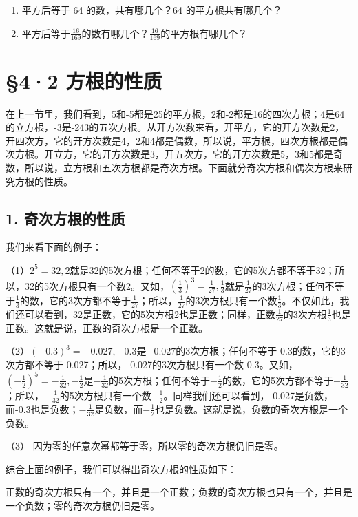 \begin{enumerate}[start=9]
\item
  平方后等于 64 的数，共有哪几个？64 的平方根共有哪几个？
\item
  平方后等于\(\frac{16}{169}\)的数有哪几个？\(\frac{16}{169}\)的平方根有哪几个？
\end{enumerate}

\section{§4·2 方根的性质}

在上一节里，我们看到，5和-5都是25的平方根，2和-2都是16的四次方根；4是64的立方根，-3是-243的五次方根。从开方次数来看，开平方，它的开方次数是2，开四次方，它的开方次数是4，2和4都是偶数，所以说，平方根，四次方根都是偶次方根。开立方，它的开方次数是3，开五次方，它的开方次数是5，3和5都是奇数，所以说，立方根和五次方根都是奇次方根。下面就分奇次方根和偶次方根来研究方根的性质。

\subsection{1. 奇次方根的性质}

我们来看下面的例子：

（1）\(2^{5} = 32, 2\)就是32的5次方根；任何不等于2的数，它的5次方都不等于32；所以，32的5次方根只有一个数2。又如，\(\left(\frac{1}{3}\right)^{3} = \frac{1}{27}, \frac{1}{3}\)就是\(\frac{1}{27}\)的3次方根；任何不等于\(\frac{1}{3}\)的数，它的3次方都不等于\(\frac{1}{27}\)；所以，\(\frac{1}{27}\)的3次方根只有一个数\(\frac{1}{3}\)。不仅如此，我们还可以看到，32是正数，它的5次方根2也是正数；同样，正数\(\frac{1}{27}\)的3次方根\(\frac{1}{3}\)也是正数。这就是说，正数的奇次方根是一个正数。

（2）\((-0.3)^{3} = -0.027, -0.3\)是\(-0.027\)的3次方根；任何不等于-0.3的数，它的3次方都不等于-0.027；所以，-0.027的3次方根只有一个数-0.3。又如，\(\left(-\frac{1}{2}\right)^{5} = -\frac{1}{32}, -\frac{1}{2}\)是\(-\frac{1}{32}\)的5次方根；任何不等于\(-\frac{1}{2}\)的数，它的5次方都不等于\(-\frac{1}{32}\)；所以，\(-\frac{1}{32}\)的5次方根只有一个数\(-\frac{1}{2}\)。同样我们还可以看到，-0.027是负数，而-0.3也是负数；\(-\frac{1}{32}\)是负数，而\(-\frac{1}{2}\)也是负数。这就是说，负数的奇次方根是一个负数。

（3） 因为零的任意次幂都等于零，所以零的奇次方根仍旧是零。

综合上面的例子，我们可以得出奇次方根的性质如下：

正数的奇次方根只有一个，并且是一个正数；负数的奇次方根也只有一个，并且是一个负数；零的奇次方根仍旧是零。


